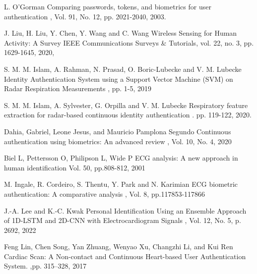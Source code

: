 \begin{bib}[100]

  L. O'Gorman
  \newblock Comparing passwords, tokens, and biometrics for user authentication
  , Vol. 91, No. 12, pp. 2021-2040, 2003.

  J. Liu, H. Liu, Y. Chen, Y. Wang and C. Wang
  \newblock Wireless Sensing for Human Activity: A Survey
  \newblock IEEE Communications Surveys \& Tutorials, vol. 22, no. 3, pp. 1629-1645, 2020,

  S. M. M. Islam, A. Rahman, N. Prasad, O. Boric-Lubecke and V. M. Lubecke
  \newblock Identity Authentication System using a Support Vector Machine (SVM) on Radar Respiration Measurements
  , pp. 1-5, 2019

  S. M. M. Islam, A. Sylvester, G. Orpilla and V. M. Lubecke
  \newblock Respiratory feature extraction for radar-based continuous identity authentication
  . pp. 119-122, 2020.
  
  Dahia, Gabriel, Leone Jesus, and Mauricio Pamplona Segundo
  \newblock Continuous authentication using biometrics: An advanced review
  , Vol. 10, No. 4, 2020

  Biel L, Pettersson O, Philipson L, Wide P
  \newblock ECG analysis: A new approach in human identification
   Vol. 50, pp.808-812, 2001

  M. Ingale, R. Cordeiro, S. Thentu, Y. Park and N. Karimian
  \newblock ECG biometric authentication: A comparative analysis
  , Vol. 8, pp.117853-117866

  J.-A. Lee and K.-C. Kwak
  \newblock Personal Identification Using an Ensemble Approach of 1D-LSTM and 2D-CNN with Electrocardiogram Signals
  ,  Vol. 12, No. 5, p. 2692, 2022

  Feng Lin, Chen Song, Yan Zhuang, Wenyao Xu, Changzhi Li, and Kui Ren
  \newblock Cardiac Scan: A Non-contact and Continuous Heart-based User Authentication System. 
   ,pp. 315–328, 2017


\end{bib}
